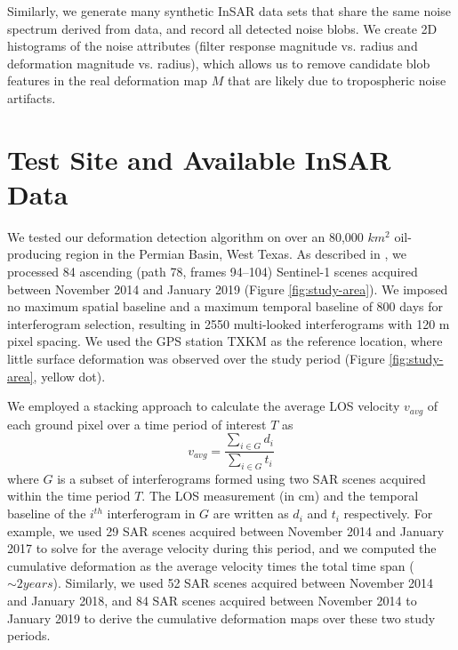 \documentclass{utexasthesis}
\begin{document}
Similarly, we generate many synthetic InSAR data sets that share the same noise spectrum derived from data, and record all detected noise blobs. We create 2D histograms of the noise attributes (filter response magnitude vs. radius and deformation magnitude vs. radius), which allows us to remove candidate blob features in the real deformation map $M$ that are likely due to tropospheric noise artifacts.

\section{Test Site and Available InSAR Data}
\label{sec:site}

We tested our deformation detection algorithm on over an 80,000 $km^2$ oil-producing region in the Permian Basin, West Texas.  As described in \cite{Staniewicz2020InsarRevealsComplex}, we processed 84 ascending (path 78, frames 94–104) Sentinel-1 scenes acquired between November 2014 and January 2019 (Figure \ref{fig:study-area}). We imposed no maximum spatial baseline and a maximum temporal baseline of 800 days for interferogram selection, resulting in 2550 multi-looked interferograms with 120 m pixel spacing.  We used the GPS station TXKM as the reference location, where little surface deformation was observed over the study period (Figure \ref{fig:study-area}, yellow dot).

We employed a stacking approach \cite{Sandwell1998PhaseGradientApproach, Staniewicz2020InsarRevealsComplex} to calculate the average LOS velocity $v_{avg}$ of each ground pixel over a time period of interest $ T $ as
\begin{equation}
v_{avg} = \frac{\sum_{i \in G} d_i}{\sum_{i \in G} t_i}
\label{eq:stacking}
\end{equation}
where $G$ is a subset of interferograms formed using two SAR scenes acquired within the time period $T$. The LOS measurement (in cm) and the temporal baseline of the $i^{th}$ interferogram in $G$ are written as $d_i$ and $ t_i $ respectively.
For example, we used 29 SAR scenes acquired between November 2014 and January 2017 to solve for the average velocity during this period, and we computed the cumulative deformation as the average velocity times the total time span ($\sim 2 years$). Similarly, we used 52 SAR scenes acquired between November 2014 and January 2018, and 84 SAR scenes acquired between November 2014 to January 2019 to derive the cumulative deformation maps over these two study periods.
\end{document}

